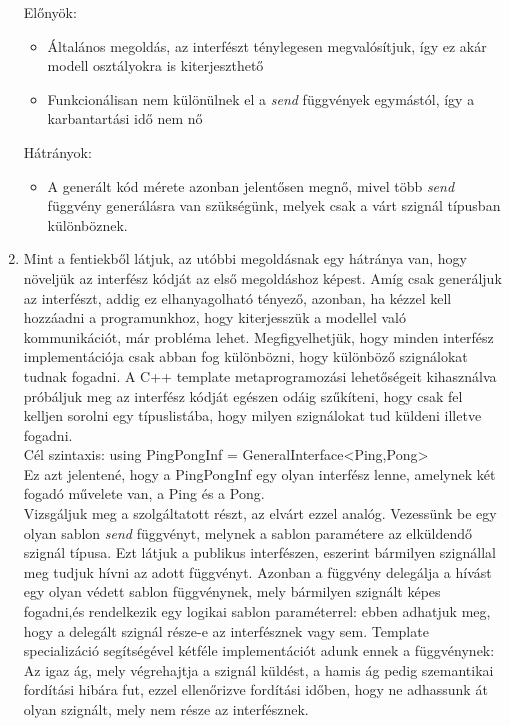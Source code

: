 \documentclass[a4paper,12pt]{report}
\begin{document}
\begin{enumerate}
Előnyök:
\begin{itemize}
\item Általános megoldás, az interfészt ténylegesen megvalósítjuk, így ez akár modell osztályokra is kiterjeszthető
\item Funkcionálisan nem különülnek el a \textit{send} függvények egymástól, így a karbantartási idő nem nő
\end{itemize}
Hátrányok:
\begin{itemize}
\item A generált kód mérete azonban jelentősen megnő, mivel több \textit{send} függvény generálásra van szükségünk, melyek csak a várt szignál típusban különböznek.
\end{itemize}
\item Mint a fentiekből látjuk, az utóbbi megoldásnak egy hátránya van, hogy növeljük az interfész kódját az első megoldáshoz képest. Amíg csak generáljuk az interfészt, addig ez elhanyagolható tényező, azonban, ha kézzel kell hozzáadni a programunkhoz, hogy kiterjesszük a modellel való kommunikációt, már probléma lehet. Megfigyelhetjük, hogy minden interfész implementációja csak abban fog különbözni, hogy különböző szignálokat tudnak fogadni. A C++ template metaprogramozási lehetőségeit kihasználva próbáljuk meg az interfész kódját egészen odáig szűkíteni, hogy csak fel kelljen sorolni egy típuslistába, hogy milyen szignálokat tud küldeni illetve fogadni. \\
Cél szintaxis: using PingPongInf = GeneralInterface<Ping,Pong> \\
Ez azt jelentené, hogy a PingPongInf egy olyan interfész lenne, amelynek két fogadó művelete van, a Ping és a Pong.\\
Vizsgáljuk meg a szolgáltatott részt, az elvárt ezzel analóg. Vezessünk be egy olyan sablon \textit{send} függvényt, melynek a sablon paramétere az elküldendő szignál típusa. Ezt látjuk a publikus interfészen, eszerint bármilyen szignállal meg tudjuk hívni az adott függvényt. Azonban a függvény delegálja a hívást egy olyan védett sablon függvénynek, mely bármilyen szignált képes fogadni,és rendelkezik egy logikai sablon paraméterrel: ebben adhatjuk meg, hogy a delegált szignál része-e az interfésznek vagy sem. 
Template specializáció segítségével kétféle implementációt adunk ennek a függvénynek: Az igaz ág, mely végrehajtja a szignál küldést, a hamis ág pedig szemantikai fordítási hibára fut, ezzel ellenőrizve fordítási időben, hogy ne adhassunk át olyan szignált, mely nem része az interfésznek. \\

\end{enumerate}
\end{document}
